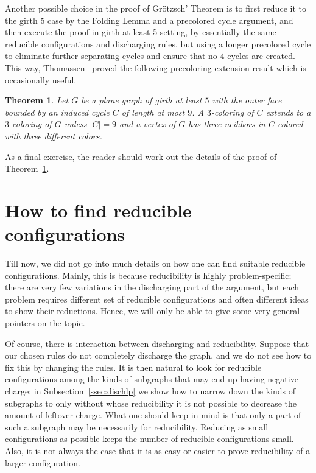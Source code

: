 \documentclass[12pt,twoside,openright,a4paper]{book}
\newtheorem{theorem}{Theorem}[chapter]
\begin{document}
Another possible choice in the proof of Gr\"otzsch' Theorem is to first reduce it to the girth 5 case by the Folding Lemma and a precolored cycle
argument, and then execute the proof in girth at least 5 setting, by essentially the same reducible configurations and discharging rules,
but using a longer precolored cycle to eliminate further separating cycles and ensure that no $4$-cycles are created.
This way, Thomassen~\cite{thom-torus} proved the following precoloring extension result which is occasionally useful.
\begin{theorem}\label{thm:precol9}
Let $G$ be a plane graph of girth at least $5$ with the outer face bounded by an induced cycle $C$ of length at most $9$.
A $3$-coloring of $C$ extends to a $3$-coloring of $G$ unless $|C|=9$ and a vertex of $G$ has three neihbors in $C$
colored with three different colors.
\end{theorem}
As a final exercise, the reader should work out the details of the proof of Theorem~\ref{thm:precol9}.

\section{How to find reducible configurations}\label{ssec:howto-redu}

Till now, we did not go into much details on how one can find suitable reducible configurations.
Mainly, this is because reducibility is highly problem-specific;
there are very few variations in the discharging part of the argument, but each problem
requires different set of reducible configurations and often different ideas to show their
reductions.  Hence, we will only be able to give some very general pointers on the topic.

Of course, there is interaction between discharging and reducibility.  Suppose that our chosen rules
do not completely discharge the graph, and we do not see how to fix this by changing the rules.
It is then natural to look for reducible configurations among the kinds of subgraphs that may end up having
negative charge; in Subsection~\ref{ssec:dischlp} we show how to narrow down the kinds of subgraphs
to only without whose reducibility it is not possible to decrease the amount of leftover charge.
What one should keep in mind is that only a part of such a subgraph may be necessarily for reducibility.
Reducing as small configurations as possible keeps the number of reducible configurations small.
Also, it is not always the case that it is as easy or easier to prove reducibility of a larger configuration.
\end{document}
